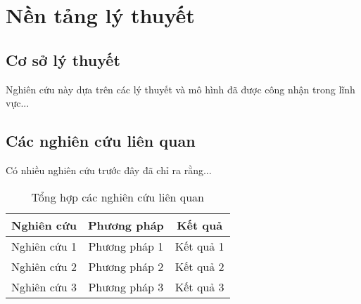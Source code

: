 \section{Nền tảng lý thuyết}
\subsection{Cơ sở lý thuyết}
Nghiên cứu này dựa trên các lý thuyết và mô hình đã được công nhận trong lĩnh vực...

\subsection{Các nghiên cứu liên quan}
Có nhiều nghiên cứu trước đây đã chỉ ra rằng...

\begin{table}[h]
    \begin{tabular}{|c|c|c|}
        \hline
        Nghiên cứu & Phương pháp \cite{CitekeyBooklet} & Kết quả \\
        \hline
        Nghiên cứu 1 & Phương pháp 1 & Kết quả 1 \\
        Nghiên cứu 2 & Phương pháp 2 & Kết quả 2 \\
        Nghiên cứu 3 & Phương pháp 3 & Kết quả 3 \\
        \hline
    \end{tabular}
    \caption{Tổng hợp các nghiên cứu liên quan}
    \label{tab:related_studies}
\end{table}